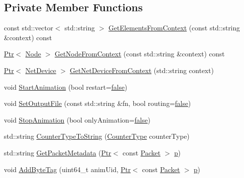 \subsection*{Private Member Functions}
\begin{DoxyCompactItemize}
\item 
const std\+::vector$<$ std\+::string $>$ \hyperlink{classns3_1_1AnimationInterface_a1dda7a7dab70c379c6424f22625f6505}{Get\+Elements\+From\+Context} (const std\+::string \&context) const 
\item 
\hyperlink{classns3_1_1Ptr}{Ptr}$<$ \hyperlink{classns3_1_1Node}{Node} $>$ \hyperlink{classns3_1_1AnimationInterface_a973c171db7344f875cb8e8ac6667688b}{Get\+Node\+From\+Context} (const std\+::string \&context) const 
\item 
\hyperlink{classns3_1_1Ptr}{Ptr}$<$ \hyperlink{classns3_1_1NetDevice}{Net\+Device} $>$ \hyperlink{classns3_1_1AnimationInterface_a5054e94f0c5e3d0a4443cfbe52e2ea30}{Get\+Net\+Device\+From\+Context} (std\+::string context)
\item 
void \hyperlink{classns3_1_1AnimationInterface_aed28bace6b97494e11179766449bb442}{Start\+Animation} (bool restart=\hyperlink{lte__cqi__generation_8m_ab1bef239d413c4da139c4bac92cd657a}{false})
\item 
void \hyperlink{classns3_1_1AnimationInterface_a48c36c7840410330afb993d1c33edc4c}{Set\+Output\+File} (const std\+::string \&fn, bool routing=\hyperlink{lte__cqi__generation_8m_ab1bef239d413c4da139c4bac92cd657a}{false})
\item 
void \hyperlink{classns3_1_1AnimationInterface_a7c668b43b1e7ed6763a587af51995b1b}{Stop\+Animation} (bool only\+Animation=\hyperlink{lte__cqi__generation_8m_ab1bef239d413c4da139c4bac92cd657a}{false})
\item 
std\+::string \hyperlink{classns3_1_1AnimationInterface_a8000df8e40811e5caca9dcdbaf295acd}{Counter\+Type\+To\+String} (\hyperlink{classns3_1_1AnimationInterface_a81ef0777d382c5eef63ea798d0ca74b9}{Counter\+Type} counter\+Type)
\item 
std\+::string \hyperlink{classns3_1_1AnimationInterface_ae117b346d05f0f13728f68ecb1050b0b}{Get\+Packet\+Metadata} (\hyperlink{classns3_1_1Ptr}{Ptr}$<$ const \hyperlink{classns3_1_1Packet}{Packet} $>$ \hyperlink{lte__link__budget__x2__handover__measures_8m_ac9de518908a968428863f829398a4e62}{p})
\item 
void \hyperlink{classns3_1_1AnimationInterface_a7963c89df19cb9a145f16a369e83ec9c}{Add\+Byte\+Tag} (uint64\+\_\+t anim\+Uid, \hyperlink{classns3_1_1Ptr}{Ptr}$<$ const \hyperlink{classns3_1_1Packet}{Packet} $>$ \hyperlink{lte__link__budget__x2__handover__measures_8m_ac9de518908a968428863f829398a4e62}{p})

\end{DoxyCompactItemize}
